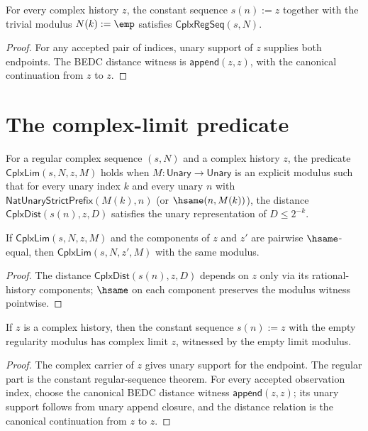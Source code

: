 \begin{lemma}
\label{lem:cplx-constant-regular}
For every complex history \(z\), the constant sequence \(s(n) := z\) together with the trivial modulus \(N(k) := \emp\) satisfies \(\mathsf{CplxRegSeq}(s, N)\).
\end{lemma}
\begin{proof}
For any accepted pair of indices, unary support of \(z\) supplies both
endpoints. The BEDC distance witness is \(\mathsf{append}(z,z)\), with the
canonical continuation from \(z\) to \(z\).
\end{proof}

\section{The complex-limit predicate}

\begin{definition}
\label{def:cplx-lim}
For a regular complex sequence \((s, N)\) and a complex history \(z\), the predicate \(\mathsf{CplxLim}(s, N, z, M)\) holds when \(M : \mathsf{Unary} \to \mathsf{Unary}\) is an explicit modulus such that for every unary index \(k\) and every unary \(n\) with \(\mathsf{NatUnaryStrictPrefix}(M(k), n)\) (or \(\hsame(n, M(k))\)), the distance \(\mathsf{CplxDist}(s(n), z, D)\) satisfies the unary representation of \(D \leq 2^{-k}\).
\end{definition}

\begin{lemma}
\label{lem:cplx-lim-hsame}
If \(\mathsf{CplxLim}(s, N, z, M)\) and the components of \(z\) and \(z'\) are pairwise \(\hsame\)-equal, then \(\mathsf{CplxLim}(s, N, z', M)\) with the same modulus.
\end{lemma}
\begin{proof}
The distance \(\mathsf{CplxDist}(s(n), z, D)\) depends on \(z\) only via its rational-history components; \(\hsame\) on each component preserves the modulus witness pointwise.
\end{proof}

\begin{theorem}
\label{thm:complex-limit-constant}
If \(z\) is a complex history, then the constant sequence \(s(n):=z\) with
the empty regularity modulus has complex limit \(z\), witnessed by the empty
limit modulus.
\end{theorem}
\begin{proof}
The complex carrier of \(z\) gives unary support for the endpoint. The regular
part is the constant regular-sequence theorem. For every accepted observation
index, choose the canonical BEDC distance witness \(\mathsf{append}(z,z)\);
its unary support follows from unary append closure, and the distance relation
is the canonical continuation from \(z\) to \(z\).
\end{proof}

